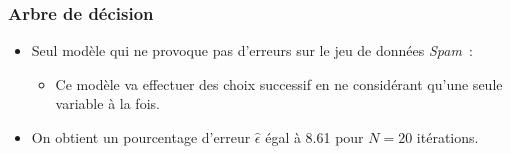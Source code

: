 \documentclass[a4paper,10pt]{report}
\begin{document}
\subsubsection{Arbre de décision}

\begin{itemize}
	\item Seul modèle qui ne provoque pas d'erreurs sur le jeu de données \textit{Spam}~:
	\begin{itemize}
		\item Ce modèle va effectuer des choix successif en ne considérant qu'une seule variable à la fois.
	\end{itemize}
	\item On obtient un pourcentage d'erreur $\hat{\epsilon}$ égal à 8.61 pour $N = 20$ itérations.
\end{itemize}
\end{document}
